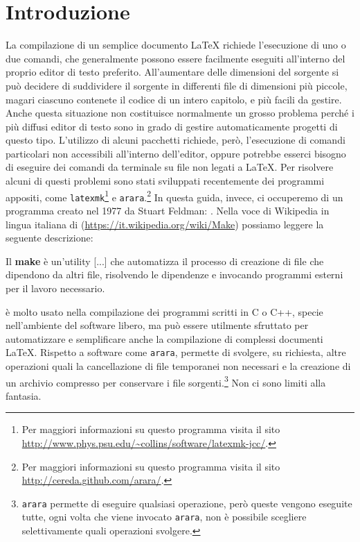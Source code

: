 \cleardoublepage{}
\chapter{Introduzione}
\label{cha:introduzione}

La compilazione di un semplice documento \LaTeX{}
richiede l'esecuzione di uno o due comandi, che generalmente possono essere
facilmente eseguiti all'interno del proprio editor di testo preferito.
All'aumentare delle dimensioni del sorgente si può decidere di suddividere il
sorgente in differenti file di dimensioni più piccole, magari ciascuno contenete
il codice di un intero capitolo, e più facili da gestire.  Anche questa
situazione non costituisce normalmente un grosso problema perché i più diffusi
editor di testo sono in grado di gestire automaticamente progetti di questo
tipo.  L'utilizzo di alcuni pacchetti richiede, però, l'esecuzione di comandi
particolari non accessibili all'interno dell'editor, oppure potrebbe esserci
bisogno di eseguire dei comandi da terminale su file non legati a \LaTeX{}.
Per risolvere alcuni di questi problemi sono stati sviluppati recentemente dei
programmi appositi, come
\texttt{latexmk}\footnote{Per maggiori informazioni su questo programma visita
  il sito \url{http://www.phys.psu.edu/~collins/software/latexmk-jcc/}.}
e
\texttt{arara}.\footnote{Per maggiori informazioni su questo programma visita il
  sito \url{http://cereda.github.com/arara/}.}
In questa guida, invece, ci occuperemo di un programma creato nel 1977 da Stuart
Feldman: .  Nella voce di Wikipedia in lingua italiana di
 (\url{https://it.wikipedia.org/wiki/Make}) possiamo leggere la
seguente descrizione:
\begin{quoting}
  Il \textbf{make} è un'utility [...] che automatizza il processo di creazione
  di file che dipendono da altri file, risolvendo le dipendenze e invocando
  programmi esterni per il lavoro necessario.
\end{quoting}
 è molto usato nella compilazione dei programmi scritti in C o
C++, specie nell'ambiente del software libero, ma può essere utilmente sfruttato
per automatizzare e semplificare anche la compilazione di complessi documenti
\LaTeX{}.
Rispetto a software come \texttt{arara},  permette di svolgere,
su richiesta, altre operazioni quali la cancellazione di file temporanei non
necessari e la creazione di un archivio compresso per conservare i file
sorgenti.\footnote{\texttt{arara} permette di eseguire qualsiasi operazione,
  però queste vengono eseguite tutte, ogni volta che viene invocato
  \texttt{arara}, non è possibile scegliere selettivamente quali operazioni
  svolgere.}  Non ci sono limiti alla fantasia.

